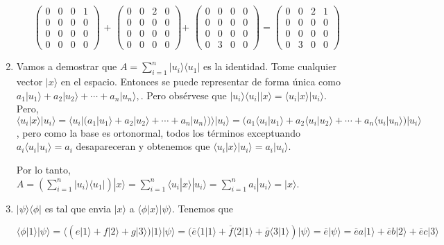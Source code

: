 \documentclass[letter,twoside,12pt]{article}
\begin{document}
\begin{enumerate}
\begin{enumerate}
$ \begin{pmatrix}
0&0&0&1
\\0&0&0&0
\\0&0&0&0
\\0&0&0&0
\end{pmatrix} $ +
$ \begin{pmatrix}
0&0&2&0
\\0&0&0&0
\\0&0&0&0
\\0&0&0&0
\end{pmatrix} $+
$ \begin{pmatrix}
0&0&0&0
\\0&0&0&0
\\0&0&0&0
\\0&3&0&0
\end{pmatrix} =
\begin{pmatrix}
0&0&2&1
\\0&0&0&0
\\0&0&0&0
\\0&3&0&0
\end{pmatrix}$

\end{enumerate}

\item Vamos a demostrar que $ A = \sum_{i=1}^n | u_i \rangle \langle u_1 |$ es la identidad. Tome cualquier vector $ |x \rangle $ en el espacio. Entonces se puede representar de forma única como $ a_1| u_1 \rangle + a_2| u_2 \rangle+\cdots + a_n| u_n \rangle,  $. Pero obsérvese que $ |u_i \rangle \langle u_i|| x \rangle = \langle u_i| x \rangle |u_i \rangle $. Pero, $ \langle u_i| x \rangle |u_i \rangle = \langle u_i| (a_1| u_1 \rangle + a_2| u_2 \rangle+\cdots + a_n| u_n \rangle) \rangle |u_i \rangle = (a_1 \langle u_i|u_1 \rangle  + a_2 \langle u_i|u_2 \rangle + \cdots + a_n \langle u_i|u_n \rangle) | u_i \rangle $, pero como la base es ortonormal, todos los términos exceptuando $ a_i\langle u_i | u_i \rangle = a_i$ desapareceran y obtenemos que $ \langle u_i| x \rangle |u_i \rangle = a_i |u_i \rangle$.

Por lo tanto, $ A = (\sum_{i=1}^n | u_i \rangle \langle u_1 |)|x \rangle = \sum_{i=1}^n \langle u_i|x \rangle | u_i \rangle  = \sum_{i=1}^n a_i | u_i \rangle = |x \rangle $.

\item $ |\psi \rangle \langle \phi |$ es tal que envia $ |x \rangle  $ a $ \langle \phi | x \rangle |\psi \rangle $. Tenemos que

$ \langle \phi | 1 \rangle |\psi \rangle = \langle (e|1\rangle + f|2\rangle +g|3\rangle)| 1 \rangle |\psi \rangle  = (\overline{e}\langle 1|1 \rangle + \overline{f}\langle 2|1 \rangle + \overline{g}\langle 3|1 \rangle )|\psi \rangle = \overline{e}|\psi \rangle = \overline{e}a|1 \rangle + \overline{e}b|2 \rangle + \overline{e}c|3 \rangle$


\end{enumerate}
\end{document}

